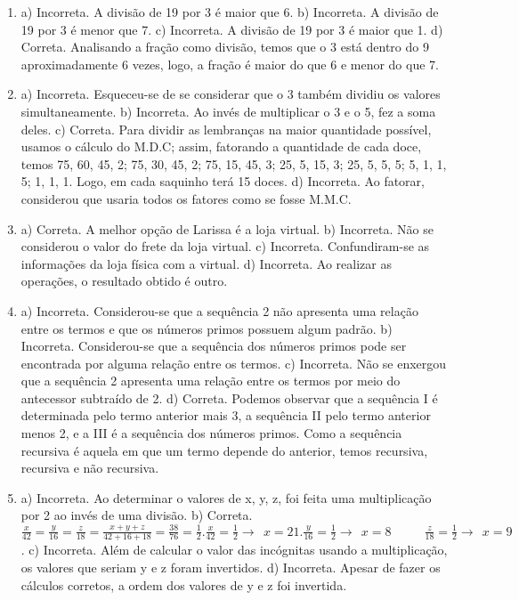 \begin{enumerate}
\item a) Incorreta. A divisão de 19 por 3 é maior que 6.
b) Incorreta. A divisão de 19 por 3 é menor que 7.
c) Incorreta. A divisão de 19 por 3 é maior que 1.
d) Correta. Analisando a fração como divisão, temos que o 3 está dentro do 9 aproximadamente 6 vezes, logo, a fração é maior do que 6 e menor do que 7.

\item a) Incorreta. Esqueceu-se de se considerar que o 3 também dividiu os valores simultaneamente.
b) Incorreta. Ao invés de multiplicar o 3 e o 5, fez a soma deles.
c) Correta. Para dividir as lembranças na maior quantidade possível, usamos o cálculo do M.D.C; assim, fatorando a quantidade de cada doce, temos 75, 60, 45, 2; 75, 30, 45, 2; 75, 15, 45, 3; 25, 5, 15, 3; 25, 5, 5, 5; 5, 1, 1, 5; 1, 1, 1. Logo, em cada saquinho terá 15 doces.
d) Incorreta. Ao fatorar, considerou que usaria todos os fatores como se fosse M.M.C.

\item a) Correta. A melhor opção de Larissa é a loja virtual.
b) Incorreta. Não se considerou o valor do frete da loja virtual.
c) Incorreta. Confundiram-se as informações da loja física com a virtual.
d) Incorreta. Ao realizar as operações, o resultado obtido é outro.

\item a) Incorreta. Considerou-se que a sequência 2 não apresenta uma relação entre os termos e que os números primos possuem algum padrão.
b) Incorreta. Considerou-se que a sequência dos números primos pode ser encontrada por alguma relação entre os termos.
c) Incorreta. Não se enxergou que a sequência 2 apresenta uma relação entre os termos por meio do antecessor subtraído de 2.
d) Correta. Podemos observar que a sequência I é determinada pelo termo anterior mais 3, a sequência II pelo termo anterior menos 2, e a
III é a sequência dos números primos. Como a sequência recursiva é aquela em que um termo depende do anterior, temos recursiva, recursiva e não recursiva.

\item a) Incorreta. Ao determinar o valores de x, y, z, foi feita uma
multiplicação por 2 ao invés de uma divisão.
b) Correta. $\frac{x}{42} = \frac{y}{16} = \frac{z}{18} = \frac{x + y + z}{42 + 16 + 18} = \frac{38}{76} = \frac{1}{2}. \frac{x}{42} = \frac{1}{2} \rightarrow \ \ x = 21. \frac{y}{16} = \frac{1}{2} \rightarrow \ \ x = 8\ \ \ \ \ \ \ \ \ \ \ \ \frac{z}{18} = \frac{1}{2} \rightarrow \ \ x = 9$.
c) Incorreta. Além de calcular o valor das incógnitas usando a
multiplicação, os valores que seriam y e z foram invertidos.
d) Incorreta. Apesar de fazer os cálculos corretos, a ordem dos
valores de y e z foi invertida.


\end{enumerate}
